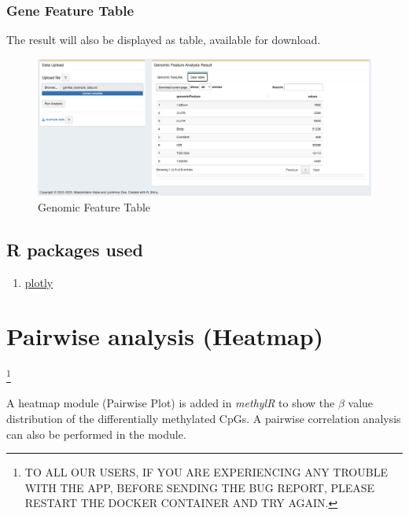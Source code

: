 \documentclass[
  a4paper,
  oneside,
  open=any]{scrreport}
\providecommand{\tightlist}{%
  \setlength{\itemsep}{0pt}\setlength{\parskip}{0pt}}\usepackage{longtable,booktabs,array}
\begin{document}
\hypertarget{gene-feature-table}{%
\subsection{Gene Feature Table}\label{gene-feature-table}}

The result will also be displayed as table, available for download.\\

\begin{figure}[H]

{\centering \includegraphics{./_images/GeneFea2.png}

}

\caption{Genomic Feature Table}

\end{figure}

\hypertarget{r-packages-used-1}{%
\section{R packages used}\label{r-packages-used-1}}

\begin{enumerate}
\def\labelenumi{\arabic{enumi}.}
\tightlist
\item
  \href{https://cran.r-project.org/web/packages/plotly/plotly.pdf}{plotly}
\end{enumerate}

\hypertarget{sec-pairwise}{%
\chapter{Pairwise analysis (Heatmap)}\label{sec-pairwise}}

\footnote{TO ALL OUR USERS, IF YOU ARE EXPERIENCING ANY TROUBLE WITH THE
  APP, BEFORE SENDING THE BUG REPORT, PLEASE RESTART THE DOCKER
  CONTAINER AND TRY AGAIN.}

A heatmap module (Pairwise Plot) is added in \emph{methylR} to show the
\(\beta\) value distribution of the differentially methylated CpGs. A
pairwise correlation analysis can also be performed in the module.
\end{document}
